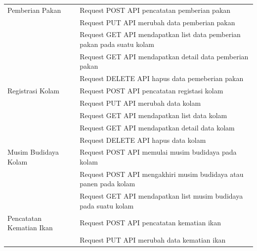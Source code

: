 \begin{enumerate}
\begin{longtable}{| p{3cm} | p{10cm} |}
Pemberian Pakan                  & Request POST API pencatatan pemberian pakan                                                    \\ \cline{2-2}
                                 & Request PUT API merubah data pemberian pakan                                              \\ \cline{2-2}
                                 & Request GET API mendapatkan list data pemberian pakan pada suatu kolam                                      \\ \cline{2-2}
                                 & Request GET API mendapatkan detail data pemberian pakan                                     \\ \cline{2-2}
                                 & Request DELETE API hapus data pemeberian pakan                                                  \\ \hline
Registrasi Kolam                 & Request POST API pencatatan registasi kolam                                                   \\ \cline{2-2}
                                 & Request PUT API merubah data kolam                                                           \\ \cline{2-2}
                                 & Request GET API mendapatkan list data kolam                                                  \\ \cline{2-2}
                                 & Request GET API mendapatkan detail data kolam                                                \\ \cline{2-2}
                                 & Request DELETE API hapus data kolam                                                             \\ \hline
Musim Budidaya Kolam            & Request POST API memulai musim budidaya pada kolam                                            \\ \cline{2-2}
                                 & Request POST API mengakhiri musim budidaya atau panen pada kolam                              \\ \cline{2-2}
                                 & Request GET API mendapatkan list musim budidaya pada suatu kolam                             \\ \hline
Pencatatan Kematian Ikan         & Request POST API pencatatan kematian ikan                                                     \\ \cline{2-2}
                                 & Request PUT API merubah data kematian ikan                                                   \\ \cline{2-2}

\end{longtable}
\end{enumerate}
